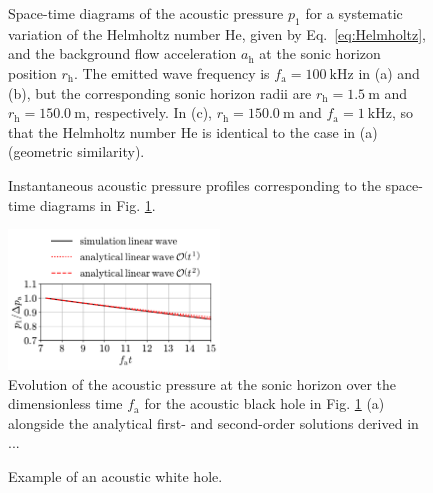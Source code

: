 \begin{figure}
\caption{Space-time diagrams of the acoustic pressure $p_1$ for a systematic variation of the Helmholtz number $\mathrm{He}$, given by Eq.~\eqref{eq:Helmholtz}, and the background flow acceleration $a_{\mathrm{h}}$ at the sonic horizon position $r_{\mathrm{h}}$. The emitted wave frequency is $f_{\mathrm{a}}=100\mathrm{\:kHz}$ in (a) and (b), but the corresponding sonic horizon radii are $r_{\mathrm{h}}=1.5\mathrm{\:m}$ and $r_{\mathrm{h}}=150.0\mathrm{\:m}$, respectively. In (c), $r_{\mathrm{h}}=150.0\mathrm{\:m}$ and $f_{\mathrm{a}}=1\mathrm{\:kHz}$, so that the Helmholtz number $\mathrm{He}$ is identical to the case in (a) (geometric similarity).}
\label{fig:rt}
\end{figure}


\begin{figure}
\caption{Instantaneous acoustic pressure profiles corresponding to the space-time diagrams in Fig. \ref{fig:rt}.}
\label{fig:pr}
\end{figure}

\begin{figure}
\centering
\includegraphics[width=0.5\textwidth]{figures/horizon_smallABH.pdf}
\caption{Evolution of the acoustic pressure at the sonic horizon over the dimensionless time $f_{\mathrm{a}}$ for the acoustic black hole in Fig. \ref{fig:rt} (a) alongside the analytical first- and second-order solutions derived in ...}
\label{fig:horizon_smallABH}
\end{figure}


\begin{figure}
\caption{Example of an acoustic white hole.}
\label{fig:WH}
\end{figure}



